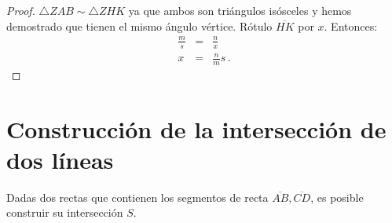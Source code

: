 \begin{proof}
$\triangle ZAB\sim\triangle ZHK$ ya que ambos son triángulos isósceles y hemos demostrado que tienen el mismo ángulo vértice. Rótulo $\overline{HK}$ por $x$. Entonces:
\begin{eqnarray*}
\frac{m}{s} &=& \frac{n}{x}\\
x&=&\frac{n}{m}s\,.
\end{eqnarray*}
\end{proof}


\section{Construcción de la intersección de dos líneas}\label{s.two-lines}

\begin{theorem}
Dadas dos rectas que contienen los segmentos de recta $\overline{AB}, \overline{CD}$, es posible construir su intersección $S$.
\end{theorem}


